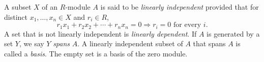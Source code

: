 A subset $X$ of an $R$-module $A$ is said to be \emph{linearly independent} provided that for distinct $x_1, \ldots, x_n \in X$ and $r_i \in R$,
\[
r_1x_1 + r_2x_2 + \cdots + r_nx_n = 0 \Rightarrow r_i = 0 \text{ for every } i.
\]
A set that is not linearly independent is \emph{linearly dependent}. If $A$ is generated by a set $Y$, we say $Y$ \emph{spans} $A$. A linearly independent subset of $A$ that spans $A$ is called a \emph{basis}. The empty set is a basis of the zero module.
